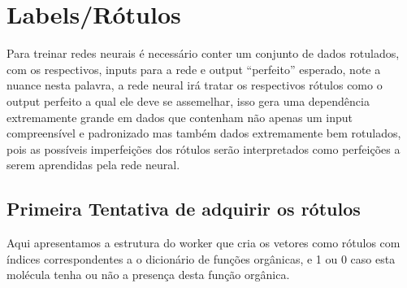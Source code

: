 \documentclass[11pt,a4paper]{article}
\begin{document}
\section{Labels/Rótulos}

Para treinar redes neurais é necessário conter um conjunto de dados rotulados, com os respectivos, inputs para a rede e output “perfeito” esperado, note a nuance nesta palavra, a rede neural irá tratar os respectivos rótulos como o output perfeito a qual ele deve se assemelhar, isso gera uma dependência extremamente grande em dados que contenham não apenas um input compreensível e padronizado mas também dados extremamente bem rotulados, pois as possíveis imperfeições dos rótulos serão interpretados como perfeições a serem aprendidas pela rede neural.

\subsection{Primeira Tentativa de adquirir os rótulos}

Aqui apresentamos a estrutura do worker que cria os vetores como rótulos com índices correspondentes a o dicionário de funções orgânicas, e 1 ou 0 caso esta molécula tenha ou não a presença desta função orgânica.
\end{document}
